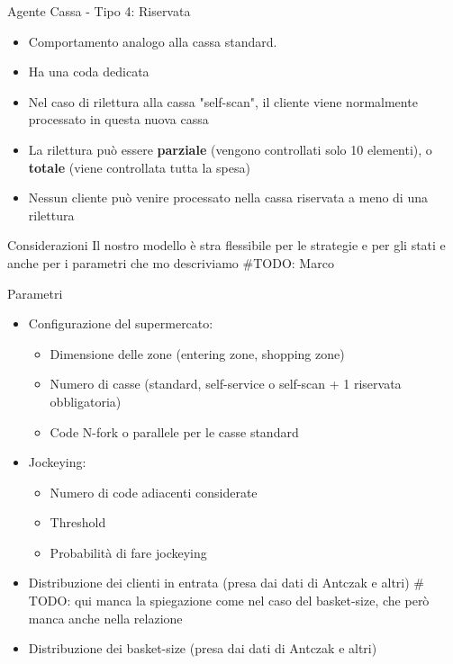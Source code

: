 \begin{frame}{Agente Cassa - Tipo 4: Riservata}
	
	\begin{itemize}
		\item Comportamento analogo alla cassa standard.
		\item Ha una coda dedicata
		\item Nel caso di rilettura alla cassa "self-scan", il cliente viene normalmente processato in questa nuova cassa
		\item La rilettura può essere \textbf{parziale} (vengono controllati solo 10 elementi), o \textbf{totale} (viene controllata tutta la spesa)
		\item Nessun cliente può venire processato nella cassa riservata a meno di una rilettura
	\end{itemize}
\end{frame}




\begin{frame}{Considerazioni}
	\centering
	Il nostro modello è stra flessibile per le strategie e per gli stati e anche per i parametri che mo descriviamo
	\#TODO: Marco
\end{frame}




\begin{frame}{Parametri}
	\begin{itemize}
		\item Configurazione del supermercato:
		\begin{itemize}
			\item Dimensione delle zone (entering zone, shopping zone)
			\item Numero di casse (standard, self-service o self-scan + 1 riservata obbligatoria)
			\item Code N-fork o parallele per le casse standard
		\end{itemize}
		\item Jockeying:
		\begin{itemize}
			\item Numero di code adiacenti considerate
			\item Threshold
			\item Probabilità di fare jockeying
		\end{itemize}
		\item Distribuzione dei clienti in entrata (presa dai dati di Antczak e altri\footnotemark) \# TODO: qui manca la spiegazione come nel caso del basket-size, che però manca anche nella relazione
		\item Distribuzione dei basket-size (presa dai dati di Antczak e altri\footnotemark[\value{footnote}])
	\end{itemize}
\end{frame}

